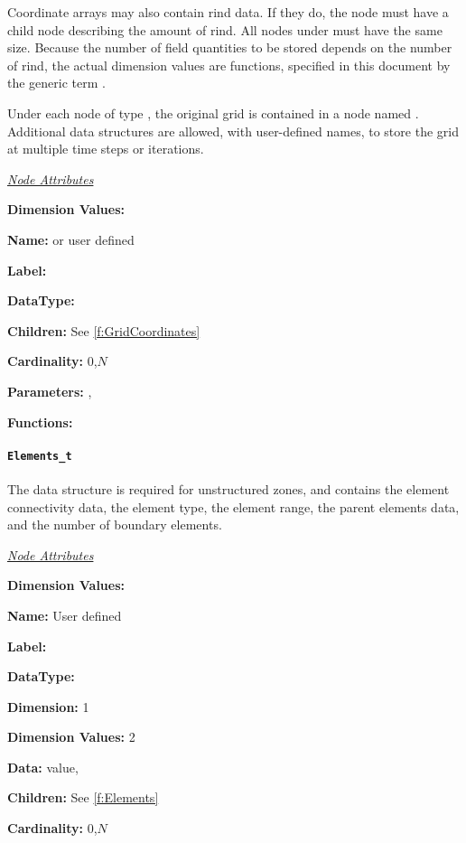 Coordinate arrays may also contain rind data. If
they do, the  node must have a 
child node describing the amount of rind. All  nodes
under  must have the same size. Because the
number of field quantities to be stored depends on the number of rind,
the actual dimension values are functions, specified in this document by
the generic term .

Under each node of type , the original grid is
contained in a node named .  Additional
 data structures are allowed, with user-defined
names, to store the grid at multiple time steps or iterations.

\textit{\uline{Node Attributes}}
\begin{Ventryic}{\textbf{Dimension Values:}}
\item [\textbf{Name:}]
       or user defined
\item [\textbf{Label:}]
\item [\textbf{DataType:}]
\item [\textbf{Children:}]
      See \autoref{f:GridCoordinates}
\item [\textbf{Cardinality:}]
      0,$N$
\item [\textbf{Parameters:}]
      , 
\item [\textbf{Functions:}]
\end{Ventryic}

\paragraph{\texttt{Elements\_t}}

The  data structure is required for unstructured
zones, and contains the element connectivity data, the element type,
the element range, the parent elements data, and the number of boundary
elements.

\textit{\uline{Node Attributes}}
\begin{Ventryic}{\textbf{Dimension Values:}}
\item [\textbf{Name:}]
      User defined
\item [\textbf{Label:}]
\item [\textbf{DataType:}]
\item [\textbf{Dimension:}]
      1
\item [\textbf{Dimension Values:}]
      2
\item [\textbf{Data:}]
       value, 
\item [\textbf{Children:}]
      See \autoref{f:Elements}
\item [\textbf{Cardinality:}]
      0,$N$
\end{Ventryic}

